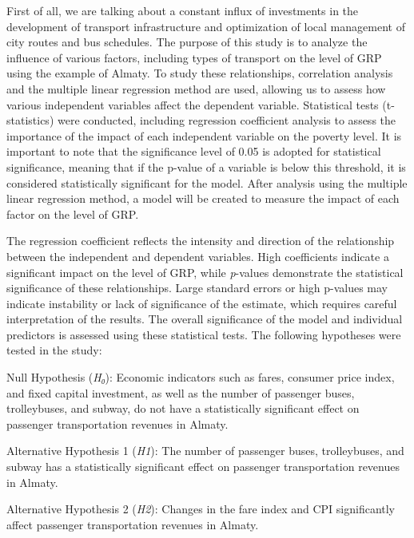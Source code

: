 First of all, we are talking about a constant influx of investments in
the development of transport infrastructure and optimization of local
management of city routes and bus schedules. The purpose of this study
is to analyze the influence of various factors, including types of
transport on the level of GRP using the example of Almaty. To study
these relationships, correlation analysis and the multiple linear
regression method are used, allowing us to assess how various
independent variables affect the dependent variable. Statistical tests
(t-statistics) were conducted, including regression coefficient analysis
to assess the importance of the impact of each independent variable on
the poverty level. It is important to note that the significance level
of 0.05 is adopted for statistical significance, meaning that if the
p-value of a variable is below this threshold, it is considered
statistically significant for the model. After analysis using the
multiple linear regression method, a model will be created to measure
the impact of each factor on the level of GRP.

The regression coefficient reflects the intensity and direction of the
relationship between the independent and dependent variables. High
coefficients indicate a significant impact on the level of GRP, while
\emph{p}-values \hspace{0pt}\hspace{0pt}demonstrate the statistical
significance of these relationships. Large standard errors or high
p-values \hspace{0pt}\hspace{0pt}may indicate instability or lack of
significance of the estimate, which requires careful interpretation of
the results. The overall significance of the model and individual
predictors is assessed using these statistical tests. The following
hypotheses were tested in the study:

Null Hypothesis (\emph{H₀}): Economic indicators such as fares, consumer
price index, and fixed capital investment, as well as the number of
passenger buses, trolleybuses, and subway, do not have a statistically
significant effect on passenger transportation revenues in Almaty.

Alternative Hypothesis 1 (\emph{H1}): The number of passenger buses,
trolleybuses, and subway has a statistically significant effect on
passenger transportation revenues in Almaty.

Alternative Hypothesis 2 (\emph{H2}): Changes in the fare index and CPI
significantly affect passenger transportation revenues in Almaty.

